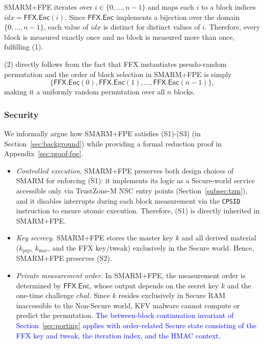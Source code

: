 \documentclass[journal]{IEEEtran}
\newcommand\ben[1]{\textcolor{blue}{#1}}
\newcommand{\rtsmarmtwo}{SMARM+FPE\xspace}
\begin{document}
\rtsmarmtwo iterates over $i \in \{0, \ldots, n-1\}$ 
and maps each $i$ to a block indices 
$idx = \mathsf{FFX.Enc}(i)$.
Since $\mathsf{FFX.Enc}$ implements a bijection over the domain 
$\{0, \ldots, n-1\}$, each value of $idx$ is distinct for 
distinct values of $i$.
Therefore, every block is measured exactly once and no block 
is measured more than once, fulfilling (1).

(2) directly follows from the fact that FFX instantiates pseudo-random permutation and the order of block selection in \rtsmarmtwo is simply\[
  \{\mathsf{FFX.Enc}(0), \mathsf{FFX.Enc}(1), \ldots,
    \mathsf{FFX.Enc}(n-1)\},
\] making it a uniformly random permutation over all $n$ blocks.



\subsubsection{Security}
We informally argue how \rtsmarmtwo satisfies (S1)-(S3) (in Section~\ref{sec:background}) while providing a formal reduction proof in Appendix~\ref{sec:proof-fpe}.

\begin{itemize}
  \item[(S1)] \emph{Controlled execution.}
  \rtsmarmtwo preserves both design choices of SMARM for 
  enforcing (S1): it implements its logic as a Secure-world 
  service accessible only via TrustZone-M NSC entry points 
  (Section~\ref{subsec:tzm}), and it disables interrupts 
  during each block measurement via the \texttt{CPSID} 
  instruction to ensure atomic execution.
  Therefore, (S1) is directly inherited in \rtsmarmtwo.

  \item[(S2)] \emph{Key secrecy.}
   \rtsmarmtwo stores the master key $k$ and all derived material ($k_{\mathrm{prp}}$, $k_{\mathrm{mac}}$, and the FFX key/tweak) exclusively in the Secure world.
  Hence, \rtsmarmtwo preserves (S2).


  \item[(S3)] \emph{Private measurement order.}
  In \rtsmarmtwo, the measurement order is determined by 
  $\mathsf{FFX.Enc}$, whose output depends on the 
  secret key $k$ and the one-time challenge $chal$.
  Since $k$ resides exclusively in Secure RAM inaccessible to the Non-Secure world, KFV malware cannot compute or predict the permutation. \ben{ The between-block continuation invariant of Section~\ref{sec:porting} applies with order-related Secure state consisting of the FFX key and tweak, the iteration index, and the HMAC context.}


\end{itemize}
\end{document}
